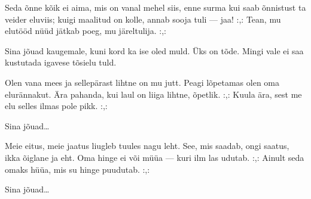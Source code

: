 Seda \~onne k\~oik ei aima,
mis on vanal mehel siis,
enne surma kui saab \~onnistust
ta veider eluviis;
kuigi maalitud on kolle,
annab sooja tuli --- jaa!
:,: Tean, mu elut\"o\"od n\"u\"ud j\"atkab poeg,
mu j\"areltulija. :,:

Sina j\~ouad
kaugemale,
kuni kord ka ise oled muld.
\"Uks on t\~ode.
Mingi vale
ei saa kustutada igavese t\~osielu tuld.

Olen vana mees ja sellep\"arast
lihtne on mu jutt.
Peagi l\~opetamas olen oma
elur\"annakut.
\"Ara pahanda, kui laul on
liiga lihtne, \~opetlik.
:,: Kuula \"ara, sest me elu
selles ilmas pole pikk. :,:

Sina j\~ouad\ldots

Meie eitus, meie jaatus
liugleb tuules nagu leht.
See, mis saadab, ongi saatus,
ikka \~oiglane ja eht.
Oma hinge ei v\~oi m\"u\"ua ---
kuri ilm las udutab.
:,: Ainult seda omaks h\"u\"ua,
mis su hinge puudutab. :,:

Sina j\~ouad\ldots